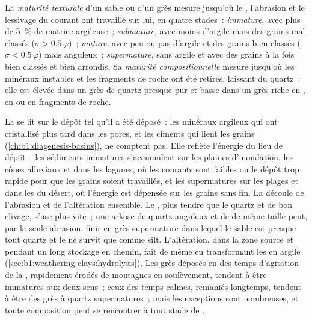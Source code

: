 \begin{definition}\label{def:b1:clastic-sediments:maturity}
La \emph{maturité texturale} d'un sable ou d'un grès
mesure jusqu'où le , l'abrasion et le lessivage du courant
ont travaillé sur lui, en quatre stades~: \emph{immature}, avec plus de
\qty{5}{\percent} de matrice argileuse~; \emph{submature}, avec moins d'argile mais des grains
mal classés ($\sigma > 0.5\,\varphi$)~; \emph{mature}, avec peu ou pas d'argile
et des grains bien classés ($\sigma < 0.5\,\varphi$) mais anguleux~;
\emph{supermature}, sans argile et avec des grains à la fois bien classés et bien arrondis.
Sa \emph{maturité compositionnelle} mesure jusqu'où
les minéraux instables et les fragments de roche ont été retirés, laissant du quartz~: elle
est élevée dans un grès de quartz presque pur et basse dans un grès riche en ,
en  ou en fragments de roche.
\end{definition}

La  se lit sur le dépôt tel qu'il a été déposé~: les minéraux argileux
qui ont cristallisé plus tard dans les pores, et les ciments qui lient les grains
(\cref{ch:b1:diagenesis-basins}), ne comptent pas. Elle reflète l'énergie du
lieu de dépôt~: les sédiments immatures s'accumulent sur les plaines d'inondation, les cônes
alluviaux et dans les lagunes, où les courants sont faibles ou le dépôt trop rapide pour que
les grains soient travaillés, et les supermatures sur les plages et dans les  du désert, où
l'énergie est dépensée sur les grains sans fin. La  découle de
l'abrasion et de l'altération ensemble. Le , plus tendre que le quartz et de
bon clivage, s'use plus vite~; une arkose de quartz anguleux et de  de
même taille peut, par la seule abrasion, finir en grès supermature dans lequel
le sable est presque tout quartz et le  ne survit que comme silt.
L'altération, dans la zone source et pendant un long stockage en chemin, fait de
même en transformant les  en argile (\cref{sec:b1:weathering-clays:hydrolysis}).
Les grès déposés en des temps d'agitation de la , rapidement érodés de montagnes
en soulèvement, tendent à être immatures aux deux sens~; ceux des temps calmes,
remaniés longtemps, tendent à être des grès à quartz supermatures~; mais les exceptions
sont nombreuses, et toute composition peut se rencontrer à tout stade de .

